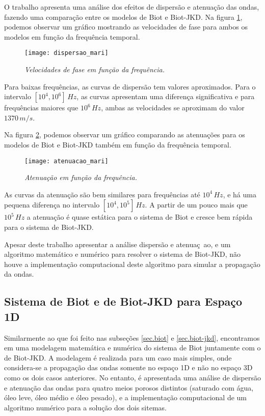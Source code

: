 O trabalho apresenta uma an\'alise dos efeitos de dispers\~ao e atenua\c{c}\~ao das ondas, fazendo uma compara\c{c}\~ao entre os modelos de Biot e Biot-JKD. Na figura \ref{fig.dispersao_mari}, podemos observar um gr\'afico mostrando as velocidades de fase para ambos os modelos em fun\c{c}\~ao da frequ\^encia temporal.
\begin{figure}
\centering
\texttt{[image: dispersao\_mari]}
\caption{\textit{Velocidades de fase em fun\c{c}\~ao da frequ\^encia.}}
\label{fig.dispersao_mari}
\end{figure} 
Para baixas frequ\^encias, as curvas de dispers\~ao tem valores aproximados. Para o intervalo $[10^4,10^6]\,Hz$, as curvas apresentam uma diferen\c{c}a significativa e para frequ\^encias maiores que $10^6\,Hz$, ambas as velocidades se aproximam do valor $1370\,m/s$.


Na figura \ref{fig.atenuacao_mari}, podemos observar um gr\'afico comparando as atenua\c{c}\~oes para os modelos de Biot e Biot-JKD tamb\'em em fun\c{c}\~ao da frequ\^encia temporal.
\begin{figure}
\centering
\texttt{[image: atenuacao\_mari]}
\caption{\textit{Atenua\c{c}\~ao em fun\c{c}\~ao da frequ\^encia.}}
\label{fig.atenuacao_mari}
\end{figure}
As curvas da atenua\c{c}\~ao s\~ao bem similares para frequ\^encias at\'e $10^4\,Hz$, e h\'a uma pequena diferen\c{c}a no intervalo $[10^4,10^5]\,Hz$. A partir de um pouco mais que $10^5\,Hz$ a atenua\c{c}\~ao \'e quase est\'atica para o sistema de Biot e cresce bem r\'apida para o sistema de Biot-JKD.

Apesar deste trabalho apresentar a an\'alise dispers\~ao e atenua\c{c}~ao, e um algoritmo matem\'atico e num\'erico para resolver o sistema de Biot-JKD, n\~ao houve a implementa\c{c}\~ao computacional deste algoritmo para simular a propaga\c{c}\~ao da ondas.

\subsection{Sistema de Biot e de Biot-JKD para Espa\c{c}o 1D}
Similarmente ao que foi feito nas subse\c{c}\~oes \ref{sec.biot} e \ref{sec.biot-jkd}, encontramos em \cite{oliveira_2018} uma modelagem matem\'atica e num\'erica do sistema de Biot juntamente com o de Biot-JKD. A modelagem \'e realizada para um caso mais simples, onde considera-se a propaga\c{c}\~ao das ondas somente no espa\c{c}o 1D e n\~ao no espa\c{c}o 3D como os dois casos anteriores. No entanto, \'e apresentada uma an\'alise de dispers\~ao e atenua\c{c}\~ao das ondas para quatro meios porosos distintos (saturado com \'agua, \'oleo leve, \'oleo m\'edio e \'oleo pesado), e a implementa\c{c}\~ao computacional de um algoritmo num\'erico para a solu\c{c}\~ao dos dois sitemas.

